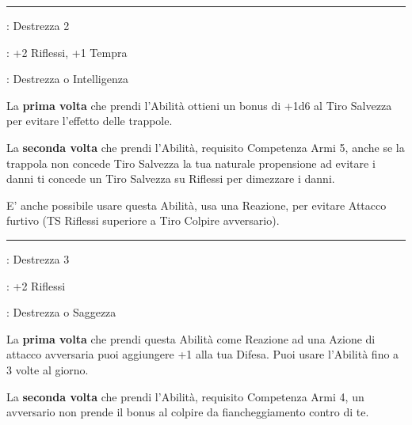 \begin{multicols}{2}
\smallskip\noindent\rule{\linewidth}{2pt} \hypertarget{Schivare trappole}{}\medskip{}
\noindent
\begin{description}[noitemsep, topsep=0pt, parsep=0pt, partopsep=0pt, leftmargin=0cm, labelwidth=2.5cm]
    \item[\textbf{Requisito}]: Destrezza 2
    \item[\textbf{Tiri Salvezza}]: +2 Riflessi, +1 Tempra
    \item[\textbf{Caratteristica}]: Destrezza o Intelligenza
\end{description}

La \textbf{prima volta} che prendi l'Abilità ottieni un bonus di +1d6 al Tiro Salvezza per evitare l'effetto delle trappole.

La \textbf{seconda volta} che prendi l'Abilità, requisito Competenza Armi 5, anche se la trappola non concede Tiro Salvezza la tua naturale propensione ad evitare i danni ti concede un Tiro Salvezza su Riflessi per dimezzare i danni.

E' anche possibile usare questa Abilità, usa una Reazione, per evitare Attacco furtivo (TS Riflessi superiore a Tiro Colpire avversario).


\smallskip\noindent\rule{\linewidth}{2pt} \hypertarget{Schivata prodigiosa}{}\medskip{}
\noindent
\begin{description}[noitemsep, topsep=0pt, parsep=0pt, partopsep=0pt, leftmargin=0cm, labelwidth=2.5cm]
    \item[\textbf{Requisito}]: Destrezza 3
    \item[\textbf{Tiri Salvezza}]: +2 Riflessi
    \item[\textbf{Caratteristica}]: Destrezza o Saggezza
\end{description}

La \textbf{prima volta} che prendi questa Abilità come Reazione ad una Azione di attacco avversaria puoi aggiungere +1 alla tua Difesa. Puoi usare l'Abilità fino a 3 volte al giorno.

La \textbf{seconda volta} che prendi l'Abilità, requisito Competenza Armi 4, un avversario non prende il bonus al colpire da fiancheggiamento contro di te.


\end{multicols}

